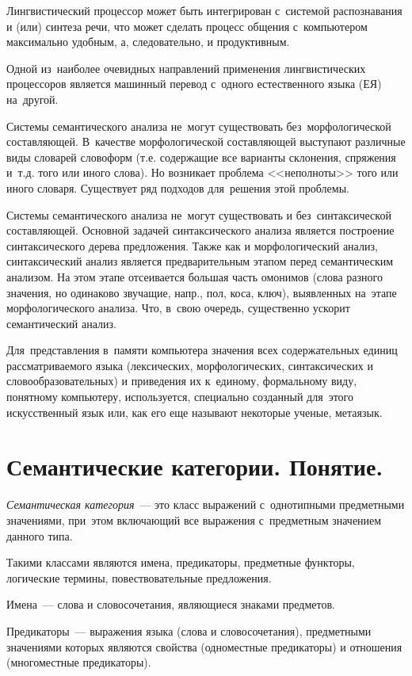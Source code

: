 \documentclass[12pt]{article}
\theoremstyle{definition}
\theoremstyle{remark}
\numberwithin{equation}{section}
\begin{document}
Лингвистический процессор может быть интегрирован с~системой распознавания 
и (или) синтеза речи, что может сделать процесс общения с~компьютером 
максимально удобным, а, следовательно, и продуктивным.

Одной из~наиболее очевидных направлений применения лингвистических 
процессоров является машинный перевод с~одного естественного языка (ЕЯ) 
на~другой.

Системы семантического анализа не~могут существовать без~морфологической 
составляющей. В~качестве морфологической составляющей выступают различные 
виды словарей словоформ (т.е. содержащие все варианты склонения, спряжения 
и~т.д. того или иного слова). Но возникает проблема <<неполноты>> того или 
иного словаря. Существует ряд подходов для~решения этой проблемы.

Системы семантического анализа не~могут существовать и без~синтаксической 
составляющей. Основной задачей синтаксического анализа является построение 
синтаксического дерева предложения. Также как и морфологический анализ, 
синтаксический анализ является предварительным этапом перед семантическим 
анализом. На этом этапе отсеивается большая часть омонимов (слова разного 
значения, но одинаково звучащие, напр., пол, коса, ключ), выявленных на~этапе 
морфологического анализа. Что, в~свою очередь, существенно ускорит 
семантический анализ.

Для~представления в~памяти компьютера значения всех содержательных единиц 
рассматриваемого языка (лексических, морфологических, синтаксических и 
словообразовательных) и приведения их к~единому, формальному виду, 
понятному компьютеру, используется, специально созданный для~этого 
искусственный язык или, как его еще называют некоторые ученые, метаязык.

\section{Семантические категории. Понятие.}
{\sl Семантическая категория}~--- это класс выражений с~однотипными 
предметными значениями, при~этом включающий все выражения с~предметным 
значением данного типа.

Такими классами являются имена, предикаторы, предметные функторы, 
логические термины, повествовательные предложения.

Имена~--- слова и словосочетания, являющиеся знаками предметов.

Предикаторы~--- выражения языка (слова и словосочетания), предметными 
значениями которых являются свойства (одноместные предикаторы) 
и отношения (многоместные предикаторы).
\end{document}
